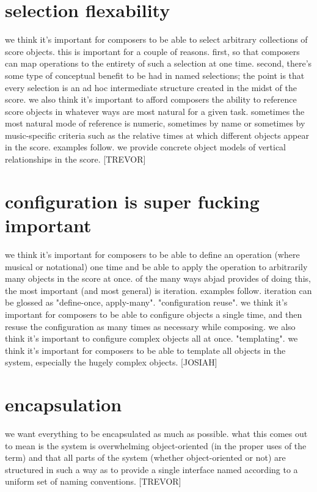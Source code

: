 \documentclass{article}
\begin{document}
\section{selection flexability}
we think it's important for composers to be able to
select arbitrary collections of score objects. this is important for a couple
of reasons. first, so that composers can map operations to the entirety of such
a selection at one time. second, there's some type of conceptual benefit to be
had in named selections; the point is that every selection is an ad hoc
intermediate structure created in the midst of the score. we also think it's
important to afford composers the ability to reference score objects in
whatever ways are most natural for a given task. sometimes the most natural
mode of reference is numeric, sometimes by name or sometimes by music-specific
criteria such as the relative times at which different objects appear in the
score. examples follow. we provide concrete object models of vertical
relationships in the score. [TREVOR]

\section{configuration is super fucking important}
we think it's important for
composers to be able to define an operation (where musical or notational) one
time and be able to apply the operation to arbitrarily many objects in the
score at once. of the many ways abjad provides of doing this, the most
important (and most general) is iteration. examples follow. iteration can be
glossed as "define-once, apply-many". "configuration reuse". we think it's
important for composers to be able to configure objects a single time, and then
resuse the configuration as many times as necessary while composing. we also
think it's important to configure complex objects all at once. "templating". we
think it's important for composers to be able to template all objects in the
system, especially the hugely complex objects. [JOSIAH]

\section{encapsulation}
we want everything to be encapsulated as much as
possible. what this comes out to mean is the system is overwhelming
object-oriented (in the proper uses of the term) and that all parts of the
system (whether object-oriented or not) are structured in such a way as to
provide a single interface named according to a uniform set of naming
conventions. [TREVOR]
\end{document}
